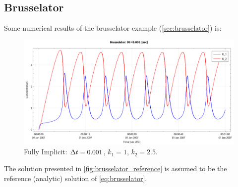 \subsection{Brusselator}
Some numerical results of the brusselator example (\autoref{sec:brusselator}) is:
\begin{figure}[H]
    \includegraphics[width=\textwidth]{figures/brusselator_imp_dt=0d001.pdf}
    \caption{Fully Implicit: $\Delta t=0.001$, $k_1=1$, $k_2=2.5$. }\label{fig:brusselator_reference}
\end{figure}
The solution presented in \autoref{fig:brusselator_reference} is assumed to be the reference (analytic) solution of \autoref{eq:brusselator}.
%
